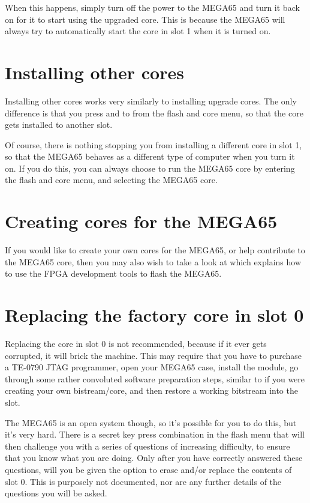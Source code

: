 When this happens, simply turn off the power to the MEGA65 and turn it back on for it to start using the
upgraded core.  This is because the MEGA65 will always try to automatically start the core in slot 1 when
it is turned on.

\section{Installing other cores}

Installing other cores works very similarly to installing upgrade cores. The only difference is that you
press  and  to  from the flash and core menu, so that the core
gets installed to another slot.

Of course, there is nothing stopping you from installing a different core
in slot 1, so that the MEGA65 behaves as a different type of computer when you turn it on.  If you do this,
you can always choose to run the MEGA65 core by entering the flash and core menu,  and selecting the MEGA65
core.

\section{Creating cores for the MEGA65}

If you would like to create your own cores for the MEGA65, or help contribute to the MEGA65 core, then
you may also wish to take a look at  which explains how to use the
FPGA development tools to flash the MEGA65.

\section{Replacing the factory core in slot 0}

Replacing the core in slot 0 is not recommended, because if it ever gets corrupted, it will brick the machine.
This may require that you have to purchase a TE-0790 JTAG programmer, open your MEGA65 case, install
the module, go through some rather convoluted software preparation steps, similar to if you were
creating your own bistream/core, and then restore a working bitstream into the slot.

The MEGA65 is an open system though, so it's possible for you to do this, but it's very hard. There
is a secret key press combination in the flash menu that will then challenge you with a series of questions of
increasing difficulty, to ensure that you know what you are doing.  Only after you have correctly
answered these questions, will you be given the option to erase and/or replace the contents of slot 0.
This is purposely not documented, nor are any further details of the questions you will be asked.

